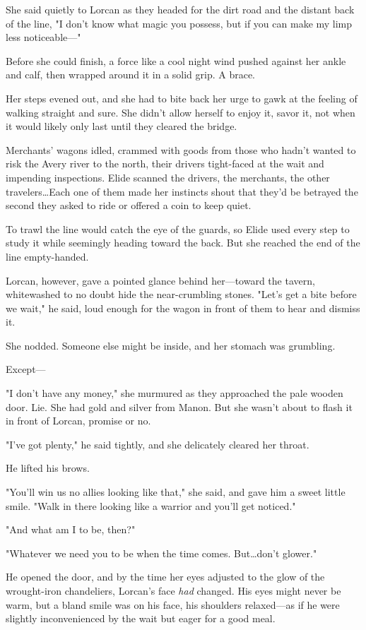 She said quietly to Lorcan as they headed for the dirt road and the distant back of the line, "I don't know what magic you possess, but if you can make my limp less noticeable---"

Before she could finish, a force like a cool night wind pushed against her ankle and calf, then wrapped around it in a solid grip.
A brace.

Her steps evened out, and she had to bite back her urge to gawk at the feeling of walking straight and sure.
She didn't allow herself to enjoy it, savor it, not when it would likely only last until they cleared the bridge.

Merchants' wagons idled, crammed with goods from those who hadn't wanted to risk the Avery river to the north, their drivers tight-faced at the wait and impending inspections.
Elide scanned the drivers, the merchants, the other travelers\ldots Each one of them made her instincts shout that they'd be betrayed the second they asked to ride or offered a coin to keep quiet.

To trawl the line would catch the eye of the guards, so Elide used every step to study it while seemingly heading toward the back.
But she reached the end of the line empty-handed.

Lorcan, however, gave a pointed glance behind her---toward the tavern, whitewashed to no doubt hide the near-crumbling stones.
"Let's get a bite before we wait," he said, loud enough for the wagon in front of them to hear and dismiss it.

She nodded.
Someone else might be inside, and her stomach was grumbling.

Except---

"I don't have any money," she murmured as they approached the pale wooden door.
Lie.
She had gold and silver from Manon.
But she wasn't about to flash it in front of Lorcan, promise or no.

"I've got plenty," he said tightly, and she delicately cleared her throat.

He lifted his brows.

"You'll win us no allies looking like that," she said, and gave him a sweet little smile.
"Walk in there looking like a warrior and you'll get noticed."

"And what am I to be, then?"

"Whatever we need you to be when the time comes.
But\ldots don't glower."

He opened the door, and by the time her eyes adjusted to the glow of the wrought-iron chandeliers, Lorcan's face \emph{had} changed.
His eyes might never be warm, but a bland smile was on his face, his shoulders relaxed---as if he were slightly inconvenienced by the wait but eager for a good meal.

